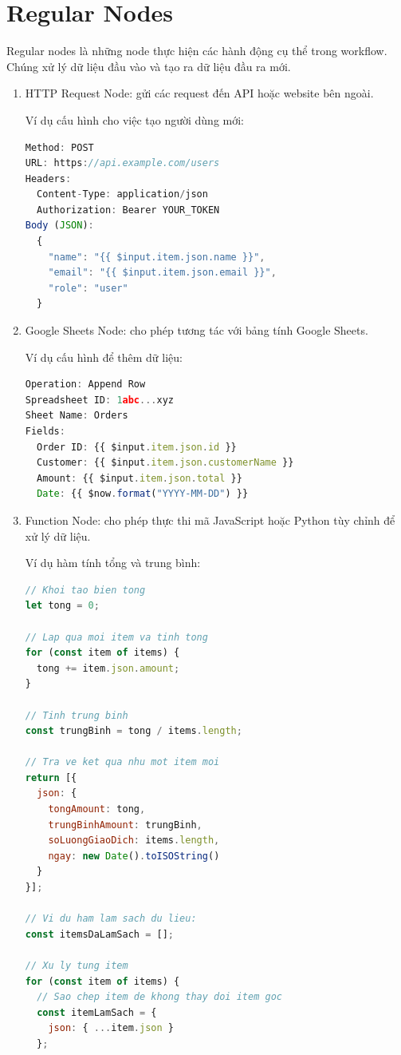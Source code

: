 \section{Regular Nodes}
Regular nodes là những node thực hiện các hành động cụ thể trong workflow. Chúng xử lý dữ liệu đầu vào và tạo ra dữ liệu đầu ra mới.
\begin{enumerate}
    \item  HTTP Request Node: gửi các request đến API hoặc website bên ngoài.

Ví dụ cấu hình cho việc tạo người dùng mới:
\begin{lstlisting}[language = Javascript] 
Method: POST
URL: https://api.example.com/users
Headers:
  Content-Type: application/json
  Authorization: Bearer YOUR_TOKEN
Body (JSON):
  {
    "name": "{{ $input.item.json.name }}",
    "email": "{{ $input.item.json.email }}",
    "role": "user"
  }
\end{lstlisting}

\item Google Sheets Node: cho phép tương tác với bảng tính Google Sheets.


Ví dụ cấu hình để thêm dữ liệu:
\begin{lstlisting}[language = Javascript]    
Operation: Append Row
Spreadsheet ID: 1abc...xyz
Sheet Name: Orders
Fields:
  Order ID: {{ $input.item.json.id }}
  Customer: {{ $input.item.json.customerName }}
  Amount: {{ $input.item.json.total }}
  Date: {{ $now.format("YYYY-MM-DD") }}
\end{lstlisting}

\item Function Node: cho phép thực thi mã JavaScript hoặc Python tùy chỉnh để xử lý dữ liệu.

Ví dụ hàm tính tổng và trung bình:
\begin{lstlisting}[language = Javascript]
// Khoi tao bien tong
let tong = 0;

// Lap qua moi item va tinh tong
for (const item of items) {
  tong += item.json.amount;
}

// Tinh trung binh
const trungBinh = tong / items.length;

// Tra ve ket qua nhu mot item moi
return [{
  json: {
    tongAmount: tong,
    trungBinhAmount: trungBinh,
    soLuongGiaoDich: items.length,
    ngay: new Date().toISOString()
  }
}];

// Vi du ham lam sach du lieu:
const itemsDaLamSach = [];

// Xu ly tung item
for (const item of items) {
  // Sao chep item de khong thay doi item goc
  const itemLamSach = {
    json: { ...item.json }
  };
  

\end{lstlisting}
\end{enumerate}
